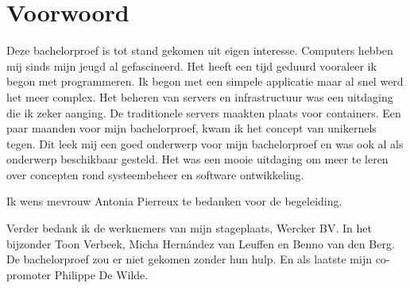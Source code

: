 
\chapter*{Voorwoord}
\label{ch:voorwoord}

Deze bachelorproef is tot stand gekomen uit eigen interesse. Computers hebben mij sinds mijn jeugd al gefascineerd. Het heeft een tijd geduurd vooraleer ik begon met programmeren. Ik begon met een simpele applicatie maar al snel werd het meer complex. Het beheren van servers en infrastructuur was een uitdaging die ik zeker aanging. De traditionele servers maakten plaats voor containers. Een paar maanden voor mijn bachelorproef, kwam ik het concept van unikernels tegen. Dit leek mij een goed onderwerp voor mijn bachelorproef en was ook al als onderwerp beschikbaar gesteld. Het was een mooie uitdaging om meer te leren over concepten rond systeembeheer en software ontwikkeling.

Ik wens mevrouw Antonia Pierreux te bedanken voor de begeleiding.

Verder bedank ik de werknemers van mijn stageplaats, Wercker BV. In het bijzonder Toon Verbeek, Micha Hernández van Leuffen en Benno van den Berg. De bachelorproef zou er niet gekomen zonder hun hulp. En als laatste mijn co-promoter Philippe De Wilde.
